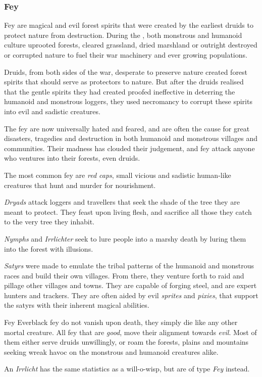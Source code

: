 \subsubsection{Fey}
\label{sec:Fey}

Fey are magical and evil forest spirits that were created by the earliest druids
to protect nature from destruction. During the ,
both monstrous and humanoid culture uprooted forests, cleared grassland, dried
marshland or outright destroyed or corrupted nature to fuel their war
machinery and ever growing populations.

Druids, from both sides of the war, desperate to preserve nature created
forest spirits that should serve as protectors to nature. But after the druids
realised that the gentle spirits they had created proofed ineffective in
deterring the humanoid and monstrous loggers, they used necromancy to corrupt
these spirits into evil and sadistic creatures.

The fey are now universally hated and feared, and are often the cause for
great disasters, tragedies and destruction in both humanoid and monstrous
villages and communities. Their madness has clouded their judgement, and fey
attack anyone who ventures into their forests, even druids.

The most common fey are \emph{red caps}, small vicious and sadistic
human-like creatures that hunt and murder for nourishment.

\emph{Dryads} attack loggers and travellers that seek the shade of the tree
they are meant to protect. They feast upon living flesh, and sacrifice all
those they catch to the very tree they inhabit.

\emph{Nymphs} and \emph{Irrlichter} seek to lure people into a marshy death by
luring them into the forest with illusions.

\emph{Satyrs} were made to emulate the tribal patterns of the humanoid and
monstrous races and build their own villages. From there, they venture forth
to raid and pillage other villages and towns. They are capable of forging
steel, and are expert hunters and trackers. They are often aided by evil
\emph{sprites} and \emph{pixies}, that support the satyrs with their inherent
magical abilities.

\begin{35e}{Fey}
  Everblack fey do not vanish upon death, they simply die like any other
  mortal creature. All fey that are \emph{good}, move their alignment towards
  \emph{evil}. Most of them either serve druids unwillingly, or roam the
  forests, plains and mountains seeking wreak havoc on the monstrous and
  humanoid creatures alike.

  An \emph{Irrlicht} has the same statistics as a will-o-wisp, but are of
  type \emph{Fey} instead.
\end{35e}
